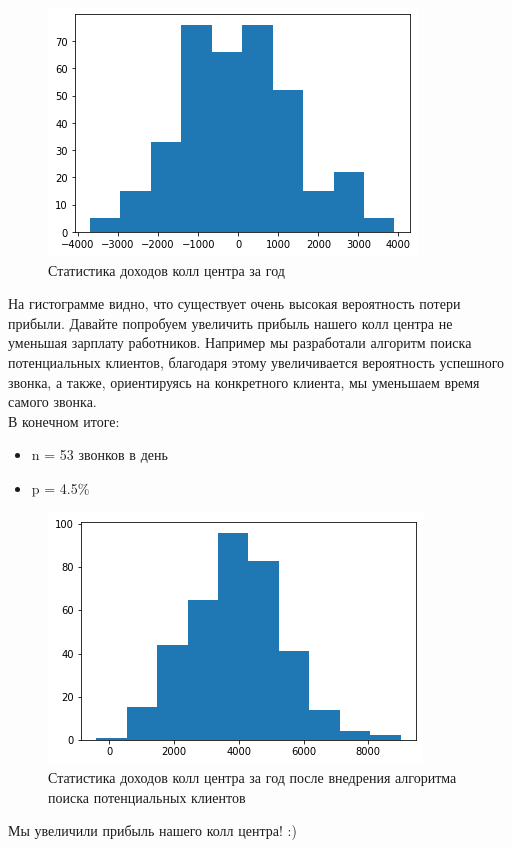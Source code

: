 \documentclass[a4paper]{article}
\begin{document}
\begin{figure}[h!]
    \centering
    \includegraphics[scale=0.5]{callcenter.png}
    \caption{Статистика доходов колл центра за год}
\end{figure}

На гистограмме видно, что существует очень высокая вероятность потери прибыли. Давайте попробуем увеличить прибыль нашего колл центра не уменьшая зарплату работников. Например мы разработали алгоритм поиска потенциальных клиентов, благодаря этому увеличивается вероятность успешного звонка, а также, ориентируясь на конкретного клиента, мы уменьшаем время самого звонка.\\
В конечном итоге:
\begin{itemize}
  \item n = 53 звонков в день
  \item p = 4.5\%
\end{itemize}

\begin{figure}[h!]
    \centering
    \includegraphics[scale=0.5]{callcenter2.png}
    \caption{Статистика доходов колл центра за год после внедрения алгоритма поиска потенциальных клиентов}
\end{figure}

Мы увеличили прибыль нашего колл центра! :)
\end{document}
